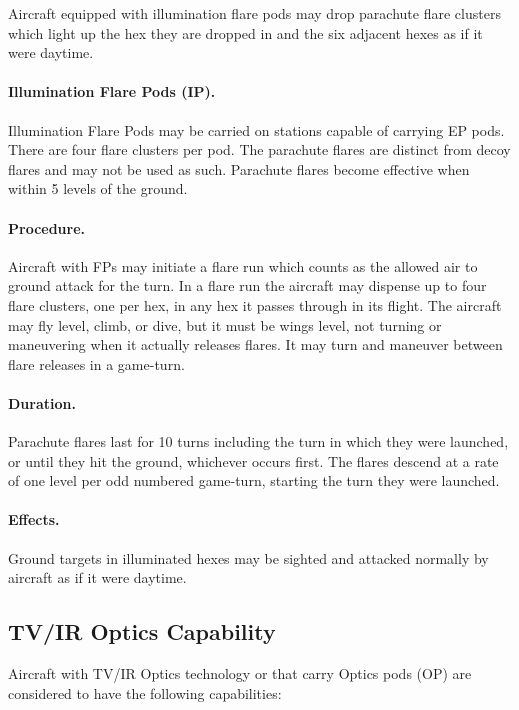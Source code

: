 \begin{advancedrules}
Aircraft equipped with illumination flare pods may drop parachute flare clusters which light up the hex they are dropped in and the six adjacent hexes as if it were daytime.

\paragraph{Illumination Flare Pods (IP).} Illumination Flare Pods may be carried on stations capable of carrying EP pods. There are four flare clusters per pod. The parachute flares are distinct from decoy flares and may not be used as such. Parachute flares become effective when within 5 levels of the ground.

\paragraph{Procedure.} Aircraft with FPs may initiate a flare run which counts as the allowed air to ground attack for the turn. In a flare run the aircraft may dispense up to four flare clusters, one per hex, in any hex it passes through in its flight. The aircraft may fly level, climb, or dive, but it must be wings level, not turning or maneuvering when it actually releases flares. It may turn and maneuver between flare releases in a game-turn.

\paragraph{Duration.} Parachute flares last for 10 turns including the turn in which they were launched, or until they hit the ground, whichever occurs first. The flares descend at a rate of one level per odd numbered game-turn, starting the turn they were launched.

\paragraph{Effects.} Ground targets in illuminated hexes may be sighted and attacked normally by aircraft as if it were daytime.

\subsection{TV/IR Optics Capability}

Aircraft with TV/IR Optics technology or that carry Optics pods (OP) are considered to have the following capabilities:

\begin{itemize}


\end{itemize}
\end{advancedrules}
